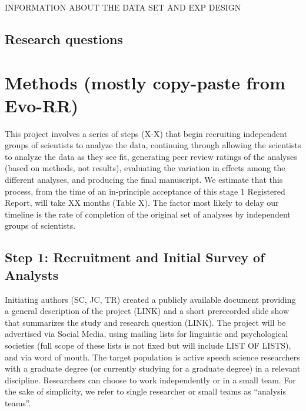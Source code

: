 \documentclass[
  english,
  man]{apa6}
\begin{document}
INFORMATION ABOUT THE DATA SET AND EXP DESIGN

\hypertarget{research-questions}{%
\subsection{Research questions}\label{research-questions}}

\hypertarget{methods-mostly-copy-paste-from-evo-rr}{%
\section{Methods (mostly copy-paste from Evo-RR)}\label{methods-mostly-copy-paste-from-evo-rr}}

This project involves a series of steps (X-X) that begin recruiting independent groups of scientists to analyze the data, continuing through allowing the scientists to analyze the data as they see fit, generating peer review ratings of the analyses (based on methods, not results), evaluating the variation in effects among the different analyses, and producing the final manuscript.
We estimate that this process, from the time of an in-principle acceptance of this stage 1 Registered Report, will take XX months (Table X).
The factor most likely to delay our timeline is the rate of completion of the original set of analyses by independent groups of scientists.

\hypertarget{step-1-recruitment-and-initial-survey-of-analysts}{%
\subsection{Step 1: Recruitment and Initial Survey of Analysts}\label{step-1-recruitment-and-initial-survey-of-analysts}}

Initiating authors (SC, JC, TR) created a publicly available document providing a general description of the project (LINK) and a short prerecorded slide show that summarizes the study and research question (LINK).
The project will be advertised via Social Media, using mailing lists for linguistic and psychological societies (full scope of these lists is not fixed but will include LIST OF LISTS), and via word of mouth.
The target population is active speech science researchers with a graduate degree (or currently studying for a graduate degree) in a relevant discipline.
Researchers can choose to work independently or in a small team.
For the sake of simplicity, we refer to single researcher or small teams as \enquote{analysis teams}.
\end{document}
